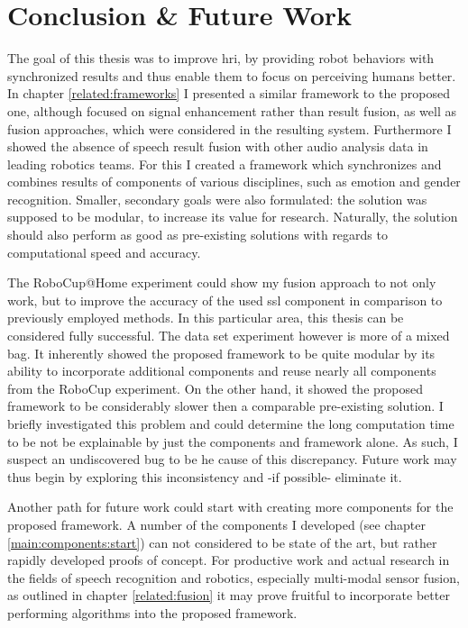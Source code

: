 

\chapter{Conclusion \& Future Work}
\label{conclusion}

The goal of this thesis was to improve \gls{hri}, by providing robot behaviors with synchronized results and thus enable them to focus on perceiving humans better.
In chapter \ref{related:frameworks} I presented a similar framework to the proposed one, although focused on signal enhancement rather than result fusion, as well as fusion approaches, which were considered in the resulting system.
Furthermore I showed the absence of speech result fusion with other audio analysis data in leading robotics teams.
For this I created a framework which synchronizes and combines results of components of various disciplines, such as emotion and gender recognition.
Smaller, secondary goals were also formulated:
the solution was supposed to be modular, to increase its value for research.
Naturally, the solution should also perform as good as pre-existing solutions with regards to computational speed and accuracy.

The RoboCup@Home experiment could show my fusion approach to not only work, but to improve the accuracy of the used \gls{ssl} component in comparison to previously employed methods.
In this particular area, this thesis can be considered fully successful.
The data set experiment however is more of a mixed bag.
It inherently showed the proposed framework to be quite modular by its ability to incorporate additional components and reuse nearly all components from the RoboCup experiment.
On the other hand, it showed the proposed framework to be considerably slower then a comparable pre-existing solution.
I briefly investigated this problem and could determine the long computation time to be not be explainable by just the components and framework alone.
As such, I suspect an undiscovered bug to be he cause of this discrepancy.
Future work may thus begin by exploring this inconsistency and -if possible- eliminate it.

Another path for future work could start with creating more components for the proposed framework.
A number of the components I developed (see chapter \ref{main:components:start}) can not considered to be state of the art, but rather rapidly developed proofs of concept.
For productive work and actual research in the fields of speech recognition and robotics, especially multi-modal sensor fusion, as outlined in chapter \ref{related:fusion} it may prove fruitful to incorporate better performing algorithms into the proposed framework.

